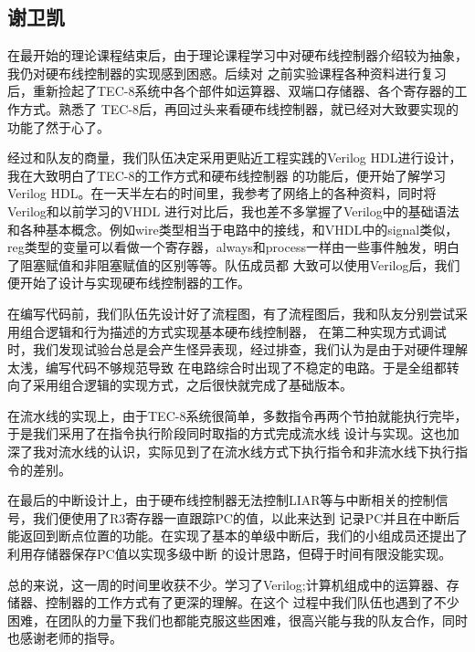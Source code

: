 \subsection*{谢卫凯}

在最开始的理论课程结束后，由于理论课程学习中对硬布线控制器介绍较为抽象，我仍对硬布线控制器的实现感到困惑。后续对
之前实验课程各种资料进行复习后，重新捡起了TEC-8系统中各个部件如运算器、双端口存储器、各个寄存器的工作方式。熟悉了
TEC-8后，再回过头来看硬布线控制器，就已经对大致要实现的功能了然于心了。

经过和队友的商量，我们队伍决定采用更贴近工程实践的Verilog HDL进行设计，我在大致明白了TEC-8的工作方式和硬布线控制器
的功能后，便开始了解学习Verilog HDL。在一天半左右的时间里，我参考了网络上的各种资料，同时将Verilog和以前学习的VHDL
进行对比后，我也差不多掌握了Verilog中的基础语法和各种基本概念。例如wire类型相当于电路中的接线，和VHDL中的signal类似，
reg类型的变量可以看做一个寄存器，always和process一样由一些事件触发，明白了阻塞赋值和非阻塞赋值的区别等等。队伍成员都
大致可以使用Verilog后，我们便开始了设计与实现硬布线控制器的工作。

在编写代码前，我们队伍先设计好了流程图，有了流程图后，我和队友分别尝试采用组合逻辑和行为描述的方式实现基本硬布线控制器，
在第二种实现方式调试时，我们发现试验台总是会产生怪异表现，经过排查，我们认为是由于对硬件理解太浅，编写代码不够规范导致
在电路综合时出现了不稳定的电路。于是全组都转向了采用组合逻辑的实现方式，之后很快就完成了基础版本。

在流水线的实现上，由于TEC-8系统很简单，多数指令再两个节拍就能执行完毕，于是我们采用了在指令执行阶段同时取指的方式完成流水线
设计与实现。这也加深了我对流水线的认识，实际见到了在流水线方式下执行指令和非流水线下执行指令的差别。

在最后的中断设计上，由于硬布线控制器无法控制LIAR等与中断相关的控制信号，我们便使用了R3寄存器一直跟踪PC的值，以此来达到
记录PC并且在中断后能返回到断点位置的功能。在实现了基本的单级中断后，我们的小组成员还提出了利用存储器保存PC值以实现多级中断
的设计思路，但碍于时间有限没能实现。

总的来说，这一周的时间里收获不少。学习了Verilog;计算机组成中的运算器、存储器、控制器的工作方式有了更深的理解。在这个
过程中我们队伍也遇到了不少困难，在团队的力量下我们也都能克服这些困难，很高兴能与我的队友合作，同时也感谢老师的指导。

